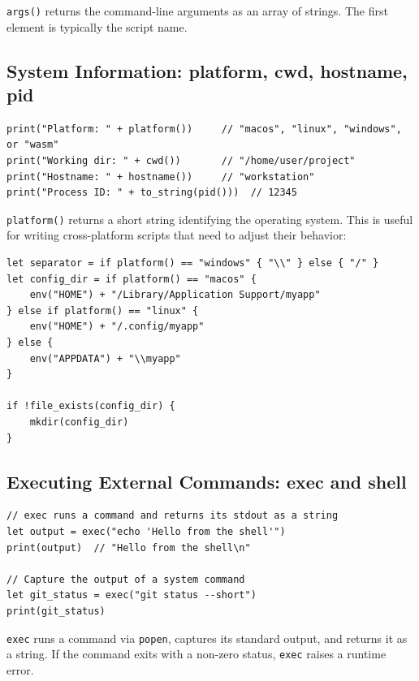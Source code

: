 \lstinline|args()| returns the command-line arguments as an array of strings.
The first element is typically the script name.

\subsection{System Information: platform, cwd, hostname, pid}
\label{sec:system-info}

\begin{lstlisting}[language=Lattice, caption={Querying system information}]
print("Platform: " + platform())     // "macos", "linux", "windows", or "wasm"
print("Working dir: " + cwd())       // "/home/user/project"
print("Hostname: " + hostname())     // "workstation"
print("Process ID: " + to_string(pid()))  // 12345
\end{lstlisting}

\lstinline|platform()| returns a short string identifying the operating
system. This is useful for writing cross-platform scripts that need to adjust
their behavior:

\begin{lstlisting}[language=Lattice, caption={Platform-specific behavior}]
let separator = if platform() == "windows" { "\\" } else { "/" }
let config_dir = if platform() == "macos" {
    env("HOME") + "/Library/Application Support/myapp"
} else if platform() == "linux" {
    env("HOME") + "/.config/myapp"
} else {
    env("APPDATA") + "\\myapp"
}

if !file_exists(config_dir) {
    mkdir(config_dir)
}
\end{lstlisting}

\subsection{Executing External Commands: exec and shell}
\label{sec:exec-shell}

\begin{lstlisting}[language=Lattice, caption={Running external commands with exec}]
// exec runs a command and returns its stdout as a string
let output = exec("echo 'Hello from the shell'")
print(output)  // "Hello from the shell\n"

// Capture the output of a system command
let git_status = exec("git status --short")
print(git_status)
\end{lstlisting}

\lstinline|exec| runs a command via \texttt{popen}, captures its standard
output, and returns it as a string. If the command exits with a non-zero
status, \lstinline|exec| raises a runtime error.

